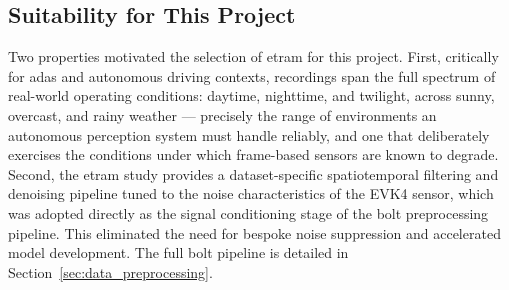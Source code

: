 \subsection{Suitability for This Project}

Two properties motivated the selection of \gls{etram} for this project.
First, critically for \gls{adas} and autonomous driving contexts, recordings span the full spectrum of real-world operating conditions: daytime, nighttime, and twilight, across sunny, overcast, and rainy weather --- precisely the range of environments an autonomous perception system must handle reliably, and one that deliberately exercises the conditions under which frame-based sensors are known to degrade.
Second, the \gls{etram} study provides a dataset-specific spatiotemporal filtering and denoising pipeline tuned to the noise characteristics of the EVK4 sensor, which was adopted directly as the signal conditioning stage of the \gls{bolt} preprocessing pipeline. This eliminated the need for bespoke noise suppression and accelerated model development.
The full \gls{bolt} pipeline is detailed in Section~\ref{sec:data_preprocessing}.
